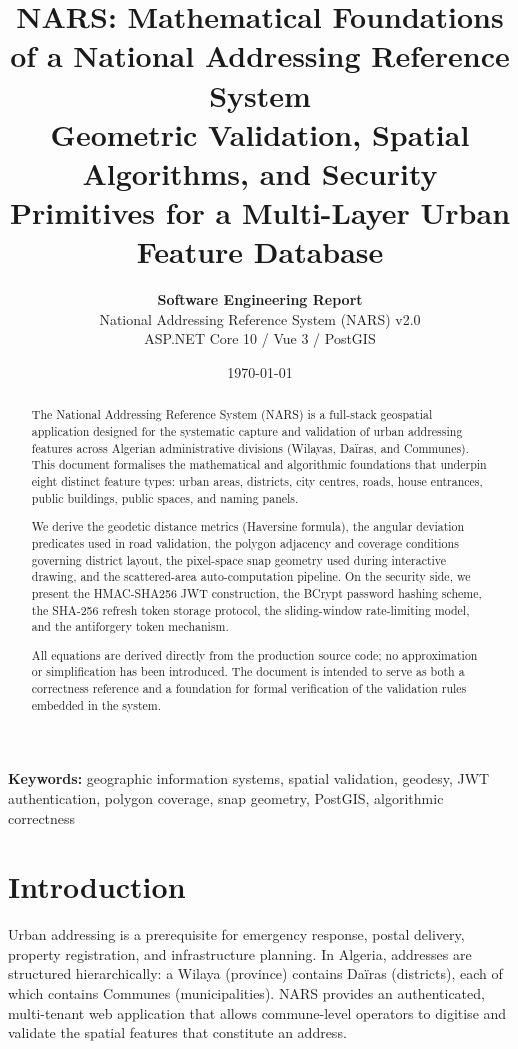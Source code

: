 \documentclass[12pt,a4paper]{article}
\title{%
  \textbf{NARS: Mathematical Foundations of a National Addressing Reference System}\\[4pt]
  \large Geometric Validation, Spatial Algorithms, and Security Primitives
  for a Multi-Layer Urban Feature Database
}
\author{%
  \textbf{Software Engineering Report} \\[4pt]
  National Addressing Reference System (NARS) v2.0 \\
  ASP.NET Core 10 / Vue 3 / PostGIS
}
\date{\today}
\theoremstyle{definition}
\theoremstyle{plain}
\theoremstyle{remark}
\begin{document}
\maketitle
\tableofcontents
\newpage

\begin{abstract}
The National Addressing Reference System (NARS) is a full-stack geospatial
application designed for the systematic capture and validation of urban
addressing features across Algerian administrative divisions (Wilayas,
Daïras, and Communes). This document formalises the mathematical and
algorithmic foundations that underpin eight distinct feature types: urban
areas, districts, city centres, roads, house entrances, public buildings,
public spaces, and naming panels.

We derive the geodetic distance metrics (Haversine formula), the angular
deviation predicates used in road validation, the polygon adjacency and
coverage conditions governing district layout, the pixel-space snap
geometry used during interactive drawing, and the scattered-area
auto-computation pipeline. On the security side, we present the HMAC-SHA256
JWT construction, the BCrypt password hashing scheme, the SHA-256 refresh
token storage protocol, the sliding-window rate-limiting model, and the
antiforgery token mechanism.

All equations are derived directly from the production source code; no
approximation or simplification has been introduced. The document is
intended to serve as both a correctness reference and a foundation for
formal verification of the validation rules embedded in the system.
\end{abstract}

\noindent\textbf{Keywords:} geographic information systems, spatial validation,
geodesy, JWT authentication, polygon coverage, snap geometry, PostGIS,
algorithmic correctness

\section{Introduction}
\label{sec:intro}

Urban addressing is a prerequisite for emergency response, postal delivery,
property registration, and infrastructure planning. In Algeria, addresses are
structured hierarchically: a Wilaya (province) contains Daïras (districts),
each of which contains Communes (municipalities). NARS provides an
authenticated, multi-tenant web application that allows commune-level
operators to digitise and validate the spatial features that constitute an
address.
\end{document}

